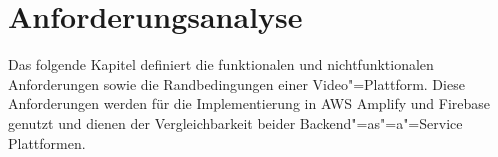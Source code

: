 \chapter{Anforderungsanalyse}

Das folgende Kapitel definiert die funktionalen und nichtfunktionalen Anforderungen sowie die Randbedingungen einer Video"=Plattform. Diese Anforderungen werden für die Implementierung in \ac{AWS} Amplify und Firebase genutzt und dienen der Vergleichbarkeit beider Backend"=as"=a"=Service Plattformen.